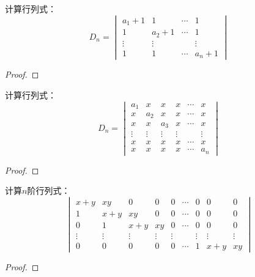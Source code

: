 \begin{problem}
计算行列式：
\begin{equation*}
    D_n=
    \begin{vmatrix}
        a_1+1  & 1      & \cdots & 1      \\
        1      & a_2+1  & \cdots & 1      \\
        \vdots & \vdots &        & \vdots \\
        1      & 1      & \cdots & a_n+1
    \end{vmatrix}
\end{equation*}
\end{problem}
\begin{proof}
\end{proof}

\begin{problem}
计算行列式：
\begin{equation*}
    D_n=
    \begin{vmatrix}
        a_1    & x      & x      & x      & \cdots & x      \\
        x      & a_2    & x      & x      & \cdots & x      \\
        x      & x      & a_3    & x      & \cdots & x      \\
        \vdots & \vdots & \vdots & \vdots &        & \vdots \\
        x      & x      & x      & x      & \cdots & x      \\
        x      & x      & x      & x      & \cdots & a_n
    \end{vmatrix}
\end{equation*}
\end{problem}
\begin{proof}
\end{proof}

\begin{problem}
计算\(n\)阶行列式：
\begin{equation*}
    \begin{vmatrix}
        x+y    & xy     & 0      & 0      & 0      & \cdots & 0      & 0      & 0      \\
        1      & x+y    & xy     & 0      & 0      & \cdots & 0      & 0      & 0      \\
        0      & 1      & x+y    & xy     & 0      & \cdots & 0      & 0      & 0      \\
        \vdots & \vdots & \vdots & \vdots & \vdots &        & \vdots & \vdots & \vdots \\
        0      & 0      & 0      & 0      & 0      & \cdots & 1      & x+y    & xy
    \end{vmatrix}
\end{equation*}
\end{problem}
\begin{proof}
\end{proof}

